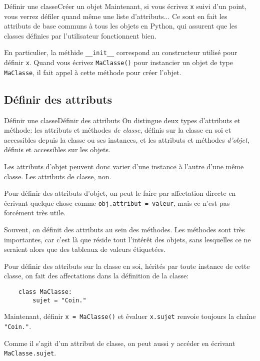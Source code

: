 \begin{frame}[fragile]{Définir une classe}{Créer un objet}
	Maintenant, si vous écrivez \lstinline|x| suivi d'un point, vous verrez défiler quand même une liste d'attributs... Ce sont en fait les attributs de base communs à tous les objets en Python, qui assurent que les classes définies par l'utilisateur fonctionnent bien.\pause
	
	En particulier, la méthide \lstinline|__init__| correspond au constructeur utilisé pour définir \lstinline|x|. Quand vous écrivez \lstinline|MaClasse()| pour instancier un objet de type \lstinline|MaClasse|, il fait appel à cette méthode pour créer l'objet.
\end{frame}

\subsection{Définir des attributs}

\begin{frame}[fragile]{Définir une classe}{Définir des attributs}
	On distingue deux types d'attributs et méthode: les attributs et méthodes \textit{de classe}, définis sur la classe en soi et accessibles depuis la classe ou ses instances, et les attributs et méthodes \textit{d'objet}, définis et accessibles sur les objets.\pause
	
	Les attributs d'objet peuvent donc varier d'une instance à l'autre d'une même classe. Les attributs de classe, non.
\end{frame}	

\begin{frame}[fragile]
	Pour définir des attributs d'objet, on peut le faire par affectation directe en écrivant quelque chose comme \lstinline|obj.attribut = valeur|, mais ce n'est pas forcément très utile.\pause
	
	Souvent, on définit des attributs au sein des méthodes. Les méthodes sont très importantes, car c'est là que réside tout l'intérêt des objets, sans lesquelles ce ne seraient alors que des tableaux de valeurs étiquetées.
\end{frame}


\begin{frame}[fragile]
	Pour définir des attributs sur la classe en soi, hérités par toute instance de cette classe, on fait des affectations dans la définition de la classe:
	\begin{lstlisting}
	class MaClasse:
		sujet = "Coin."
	\end{lstlisting}\pause
	
	Maintenant, définir \lstinline|x = MaClasse()| et évaluer \lstinline|x.sujet| renvoie toujours la chaîne \lstinline|"Coin."|.
	
	Comme il s'agit d'un attribut de classe, on peut aussi y accéder en écrivant \lstinline|MaClasse.sujet|.
\end{frame}

